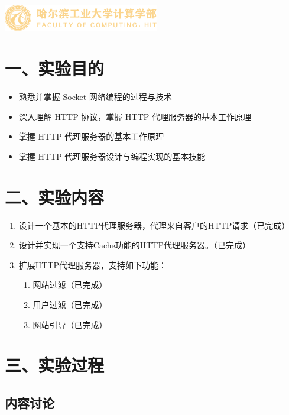 \documentclass{ctexart}
\begin{document}
\begin{titlepage}
    \includegraphics[width=2.68in]{foc_logo}

\end{titlepage}

\section*{一、实验目的}

\begin{itemize}
    \item 熟悉并掌握 Socket ⽹络编程的过程与技术
    \item 深⼊理解 HTTP 协议，掌握 HTTP 代理服务器的基本⼯作原理
    \item 掌握 HTTP 代理服务器的基本⼯作原理
    \item 掌握 HTTP 代理服务器设计与编程实现的基本技能
\end{itemize}

\section*{二、实验内容}

\begin{enumerate}
    \item 设计一个基本的HTTP代理服务器，代理来自客户的HTTP请求（已完成）
    \item 设计并实现一个支持Cache功能的HTTP代理服务器。（已完成）
    \item 扩展HTTP代理服务器，支持如下功能：\begin{enumerate}
            \item 网站过滤（已完成）
            \item 用户过滤（已完成）
            \item 网站引导（已完成）
    \end{enumerate}
\end{enumerate}

\section*{三、实验过程}

\subsection*{内容讨论}
\end{document}

